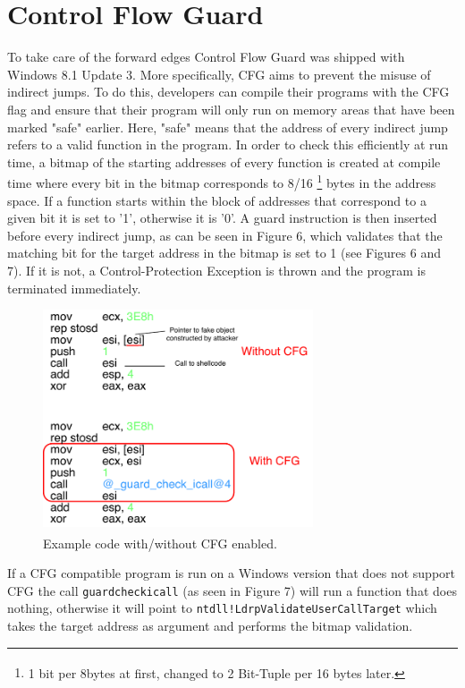 \documentclass[10pt,twocolumn,a4paper]{article}
\begin{document}
\section{Control Flow Guard}\label{CFG}
To take care of the forward edges Control Flow Guard was shipped with Windows 8.1 Update 3\cite{cfgexplore}.
More specifically, CFG aims to prevent the misuse of indirect jumps.
To do this, developers can compile their programs with the CFG flag and ensure that their program will only run on memory areas that have been marked "safe" earlier\cite{CFG2}.
Here, "safe" means that the address of every indirect jump refers to a valid function in the program.
In order to check this efficiently at run time, a bitmap of the starting addresses of every function is created at compile time where every bit in the bitmap corresponds to 8/16 \footnote{1 bit per 8bytes at first, changed to 2 Bit-Tuple per 16 bytes later\textsuperscript{\cite{tuple}}.} bytes in the address space\cite{cfgexplore}.
If a function starts within the block of addresses that correspond to a given bit it is set to '1', otherwise it is '0'.
A guard instruction is then inserted before every indirect jump, as can be seen in Figure 6, which validates that the matching bit for the target address in the bitmap is set to 1 (see Figures 6 and 7)\cite{cfgexplore}. If it is not, a Control-Protection Exception is thrown and the program is terminated immediately\cite{SS}.
\begin{figure}[htbp]
	\includegraphics[keepaspectratio,width=8cm]{fig/cfg}
	\caption{Example code with/without CFG enabled\textsuperscript{\cite{cfgexplore}}.}
\end{figure}
If a CFG compatible program is run on a Windows version that does not support CFG the call \texttt{\textunderscore guard\textunderscore check\textunderscore icall} (as seen in Figure 7) will run a function that does nothing, otherwise it will point to \texttt{ntdll!LdrpValidateUserCallTarget} which takes the target address as argument and performs the bitmap validation\cite{cfgexplore}.
\end{document}
